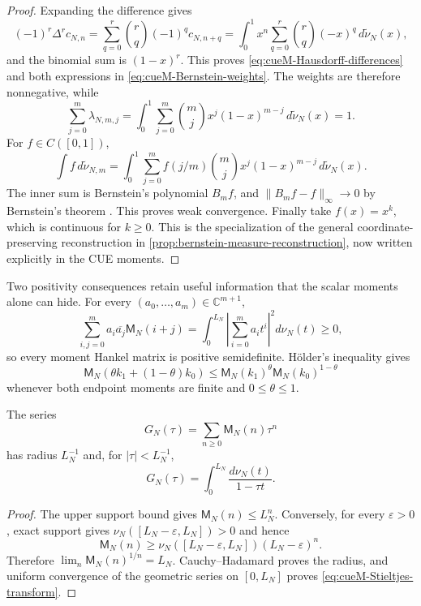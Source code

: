 \begin{proof}
Expanding the difference gives
\[
 (-1)^r\Delta^r c_{N,n}
 =\sum_{q=0}^{r}\binom rq(-1)^q c_{N,n+q}
 =\int_0^1x^n\sum_{q=0}^{r}\binom rq(-x)^q\,d\widetilde\nu_N(x),
\]
and the binomial sum is $(1-x)^r$.  This proves
\eqref{eq:cueM-Hausdorff-differences} and both expressions in
\eqref{eq:cueM-Bernstein-weights}.  The weights are therefore nonnegative, while
\[
 \sum_{j=0}^{m}\lambda_{N,m,j}
 =\int_0^1\sum_{j=0}^{m}\binom mjx^j(1-x)^{m-j}\,d\widetilde\nu_N(x)=1.
\]
For $f\in C([0,1])$,
\[
 \int f\,d\widetilde\nu_{N,m}
 =\int_0^1\sum_{j=0}^{m}f(j/m)\binom mjx^j(1-x)^{m-j}
   \,d\widetilde\nu_N(x).
\]
The inner sum is Bernstein's polynomial $B_mf$, and
$\lVert B_mf-f\rVert_\infty\to0$ by Bernstein's theorem
\cite[eqs.~(1)--(5)]{bernstein1912}.  This proves weak convergence.  Finally take
$f(x)=x^k$, which is continuous for $k\geq0$.  This is the specialization of the general
coordinate-preserving reconstruction in
\cref{prop:bernstein-measure-reconstruction}, now written explicitly in the CUE moments.
\end{proof}

Two positivity consequences retain useful information that the scalar moments alone can
hide.  For every $(a_0,\ldots,a_m)\in\mathbb C^{m+1}$,
\begin{equation}
 \sum_{i,j=0}^{m}a_i\overline{a_j}\mathsf M_N(i+j)
 =\int_0^{L_N}\left|\sum_{i=0}^{m}a_it^i\right|^2d\nu_N(t)\geq0,
 \label{eq:cueM-Hankel-PSD}
\end{equation}
so every moment Hankel matrix is positive semidefinite.  H\"older's inequality gives
\begin{equation}
 \mathsf M_N(\theta k_1+(1-\theta)k_0)
 \leq\mathsf M_N(k_1)^\theta\mathsf M_N(k_0)^{1-\theta}
 \label{eq:cueM-log-convex}
\end{equation}
whenever both endpoint moments are finite and $0\leq\theta\leq1$.

\begin{proposition}
\label{prop:cueM-Stieltjes-radius}
The series
\[
 G_N(\tau)=\sum_{n\geq0}\mathsf M_N(n)\tau^n
\]
has radius $L_N^{-1}$ and, for $|\tau|<L_N^{-1}$,
\begin{equation}
 G_N(\tau)=\int_0^{L_N}\frac{d\nu_N(t)}{1-\tau t}.
 \label{eq:cueM-Stieltjes-transform}
\end{equation}
\end{proposition}

\begin{proof}
The upper support bound gives $\mathsf M_N(n)\leq L_N^n$.  Conversely, for every
$\varepsilon>0$, exact support gives
$\nu_N([L_N-\varepsilon,L_N])>0$ and hence
\[
 \mathsf M_N(n)\geq
 \nu_N([L_N-\varepsilon,L_N])(L_N-\varepsilon)^n.
\]
Therefore $\lim_n\mathsf M_N(n)^{1/n}=L_N$.  Cauchy--Hadamard proves the radius, and uniform
convergence of the geometric series on $[0,L_N]$ proves
\eqref{eq:cueM-Stieltjes-transform}.
\end{proof}

